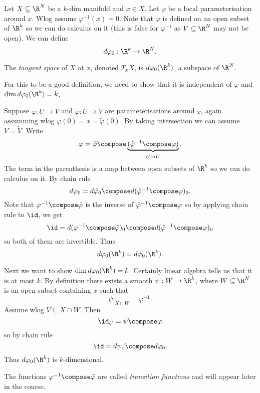 \documentclass[a4paper]{article}
\begin{document}
Let \(X \subseteq \R^N\) be a \(k\)-dim manifold and \(x \in X\). Let \(\varphi\) be a local parameterisation around \(x\). Wlog assume \(\varphi^{-1}(x) = 0\). Note that \(\varphi\) is defined on an open subset of \(\R^k\) so we can do calculus on it (this is false for \(\varphi^{-1}\) as \(V \subseteq \R^N\) may not be open). We can define
\[
  d\varphi_0: \R^k \to \R^N.
\]

\begin{definition}
  The \emph{tangent space} of \(X\) at \(x\), denoted \(T_xX\), is \(d\varphi_0(\R^k)\), a subspace of \(\R^N\).
\end{definition}

For this to be a good definition, we need to show that it is independent of \(\varphi\) and \(\dim d\varphi_0(\R^k) = k\).

Suppose \(\varphi: U \to V\) and \(\tilde \varphi: \tilde U \to \tilde V\) are parameterisations around \(x\), again assumming wlog \(\varphi(0) = x = \tilde \varphi(0)\). By taking intersection we can assume \(V = \tilde V\). Write
\[
  \varphi = \tilde \varphi \compose \underbrace{(\tilde \varphi^{-1} \compose \varphi)}_{U \to \tilde U}.
\]
The term in the parenthesis is a map between open subsets of \(\R^k\) so we can do calculus on it. By chain rule
\[
  d\varphi_0 = d\tilde \varphi_0 \compose d(\tilde \varphi^{-1} \compose \varphi)_0.
\]
Note that \(\varphi^{-1} \compose \tilde \varphi\) is the inverse of \(\tilde \varphi^{-1} \compose \varphi\) so by applying chain rule to \(\id\), we get
\[
  \id = d(\varphi^{-1} \compose \tilde \varphi)_0 \compose d(\tilde \varphi^{-1} \compose \varphi)_0
\]
so both of them are invertible. Thus
\[
  d\varphi_0(\R^k) = d\tilde \varphi_0(\R^k).
\]

Next we want to show \(\dim d\varphi_0(\R^k) = k\). Certainly linear algebra tells us that it is at most \(k\). By definition there exists a smooth \(\psi: W \to \R^k\), where \(W \subseteq \R^N\) is an open subset containing \(x\) such that
\[
  \psi|_{X \cap W} = \varphi^{-1}.
\]
Assume wlog \(V \subseteq X \cap W\). Then
\[
  \id_U = \psi \compose \varphi
\]
so by chain rule
\[
  \id = d\psi_x \compose d\varphi_0.
\]
Thus \(d\varphi_0(\R^k)\) is \(k\)-dimensional.

\begin{remark}
  The functions \(\varphi^{-1} \compose \tilde \varphi\) are called \emph{transition functions} and will appear later in the course.
\end{remark}
\end{document}
